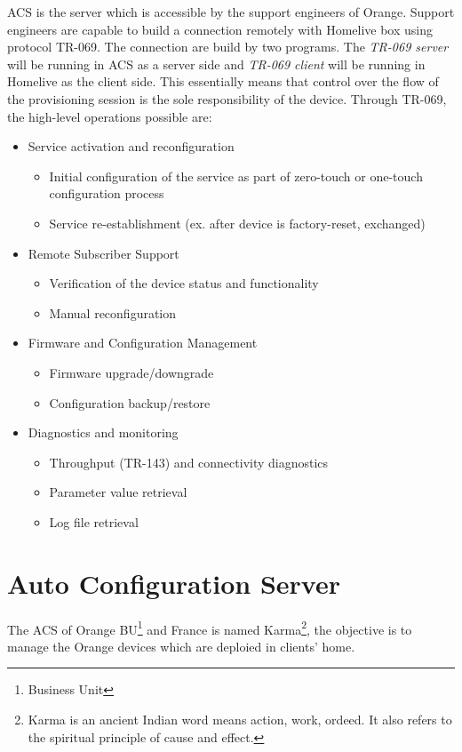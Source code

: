 ACS is the server which is accessible by the support engineers of Orange. Support engineers are capable to build a connection remotely with Homelive box using protocol TR-069. The connection are build by two programs. The \textit{TR-069 server} will be running in ACS as a server side and \textit{TR-069 client} will be running in Homelive as the client side. This essentially means that control over the flow of the provisioning session is the sole responsibility of the device. Through TR-069, the high-level operations possible are:
\begin{itemize}
  \item Service activation and reconfiguration
  \begin{itemize}
    \item Initial configuration of the service as part of zero-touch or one-touch configuration process
    \item Service re-establishment (ex. after device is factory-reset, exchanged)
  \end{itemize}
  \item Remote Subscriber Support
  \begin{itemize}
    \item Verification of the device status and functionality
    \item Manual reconfiguration
  \end{itemize}
  \item Firmware and Configuration Management
  \begin{itemize}
    \item Firmware upgrade/downgrade
    \item Configuration backup/restore
  \end{itemize}
  \item Diagnostics and monitoring
  \begin{itemize}
    \item Throughput (TR-143) and connectivity diagnostics
    \item Parameter value retrieval
    \item Log file retrieval
  \end{itemize}
\end{itemize}
\section{Auto Configuration Server}
The ACS of Orange BU\footnote{Business Unit} and France is named Karma\footnote{Karma is an ancient Indian word means action, work, ordeed. It also refers to the spiritual principle of cause and effect.}, the objective is to manage the Orange devices which are deploied in clients' home.

